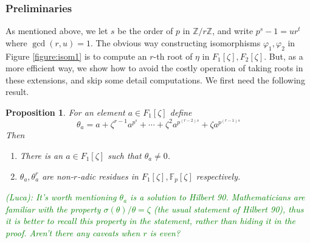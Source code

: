 \documentclass[12pt]{article}
\theoremstyle{plain}
\newtheorem{proposition}[theorem]{Proposition}
\theoremstyle{definition}
\newcommand{\comment}[2][Note]{\textcolor{green}{(#1): #2}}
\def\F{\ensuremath{\mathbb{F}}}
\begin{document}

\subsubsection{Preliminaries}

As mentioned above, we let $s$ be the order of $p$ in $\mathbb{Z} / r\mathbb{Z}$, and write $p^s - 
1 = ur^t$ where $\gcd(r, u) = 1$. The obvious way constructing isomorphisms $\varphi_1, \varphi_2$ 
in Figure \ref{figure:isom1} is to compute an $r$-th root of $\eta$ in $F_1[\zeta], F_2[\zeta]$. 
But, as a more efficient way, we show how to avoid the costly operation of taking roots in these 
extensions, and skip some detail computations. We first need the following result.
\begin{proposition}
	\label{proposition:semi-trace}
	For an element $a \in F_1[\zeta]$ define 
	\begin{equation}
	\label{equation:semi-trace} 
	\theta_a = a + \zeta^{r - 1}a^{p^s} + \cdots + \zeta^2a^{p^{(r - 2)s}} + \zeta a^{p^{(r - 1)s}}
	\end{equation}
	Then
	\begin{enumerate}
		\item[\normalfont (i)] There is an $a \in F_1[\zeta]$ such that $\theta_a \ne 0$.
		\item[\normalfont (ii)] $\theta_a, \theta_a^r$ are non-$r$-adic residues in $F_1[\zeta], 
		\F_p[\zeta]$ respectively.
	\end{enumerate}
        \comment[Luca]{It's worth mentioning $\theta_a$ is a solution to Hilbert 90. Mathematicians are familiar with the property $\sigma(\theta)/\theta=\zeta$ (the usual statement of Hilbert 90), thus it is better to recall this property in the statement, rather than hiding it in the proof. Aren't there any \emph{caveats} when $r$ is even?}
\end{proposition}
\end{document}

